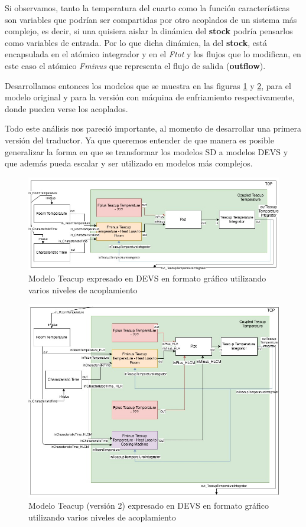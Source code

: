 Si observamos, tanto la temperatura del cuarto como la función características son variables que podrían ser compartidas por otro acoplados de un sistema más complejo, es decir, si una quisiera aislar la dinámica del \textbf{stock} podría pensarlos como variables de entrada. Por lo que dicha dinámica, la del \textbf{stock}, está encapsulada en el atómico integrador y en el \textit{Ftot} y los flujos que lo modifican, en este caso el atómico \textit{Fminus} que representa el flujo de salida (\textbf{outflow}).

Desarrollamos entonces los modelos que se muestra en las figuras \ref{fig:Teacup_devs} y \ref{fig:Teacup_devs_2}, para el modelo original y para la versión con máquina de enfriamiento respectivamente, donde pueden verse los acoplados. 

Todo este análisis nos pareció importante, al momento de desarrollar una primera versión del traductor. Ya que queremos entender de que manera es posible generalizar la forma en que se transformar los modelos SD a modelos DEVS y que además pueda escalar y ser utilizado en modelos más complejos. 

\begin{figure}[!h]
	\centering
	\includegraphics[scale=0.35]{imagenes/Teacup_devs}
	\caption{Modelo Teacup expresado en DEVS en formato gráfico utilizando varios niveles de acoplamiento}
	\label{fig:Teacup_devs}
\end{figure}
\begin{figure}[!h]
	\centering
	\includegraphics[scale=0.35]{imagenes/Teacup_devs_2}
	\caption{Modelo Teacup (versión 2) expresado en DEVS en formato gráfico utilizando varios niveles de acoplamiento}
	\label{fig:Teacup_devs_2}
\end{figure}
